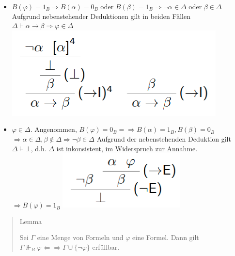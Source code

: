 \documentclass[a4paper]{article}
\begin{document}
\begin{multicols}{3}
  \begin{itemize}
    \itemsep1pt\parskip0pt
    \item
          $B(\varphi) = 1_B \Rightarrow B(\alpha) = 0_B$ oder
          $B(\beta) = 1_B \Rightarrow\lnot\alpha\in\Delta$ oder $\beta\in\Delta$
          Aufgrund nebenstehender Deduktionen gilt in beiden Fällen
          $\Delta\vdash\alpha\rightarrow\beta\Rightarrow\varphi\in\Delta$
          \includegraphics[width=\linewidth]{Assets/Logik-beispiel-9.png}
    \item
          $\varphi\in\Delta$. Angenommen,
          $B(\varphi) = 0_B = \Rightarrow B(\alpha) = 1_B, B(\beta) = 0_B$
          $\Rightarrow\alpha\in\Delta, \beta\not\in\Delta \Rightarrow \lnot\beta\in\Delta$
          Aufgrund der nebenstehenden Deduktion gilt $\Delta\vdash\bot$, d.h.
          $\Delta$ ist inkonsistent, im Widerspruch zur Annahme.
          $\Rightarrow B(\varphi) = 1_B$
          \includegraphics[width=\linewidth]{Assets/Logik-beispiel-10.png}
  \end{itemize}

  \begin{quote}
    Lemma

    Sei $\Gamma$ eine Menge von Formeln und $\varphi$ eine Formel. Dann gilt
    $\Gamma\not\Vdash_B\varphi\Leftarrow\Rightarrow\Gamma\cup\{\lnot \varphi\}$
    erfüllbar.
  \end{quote}


\end{multicols}
\end{document}
